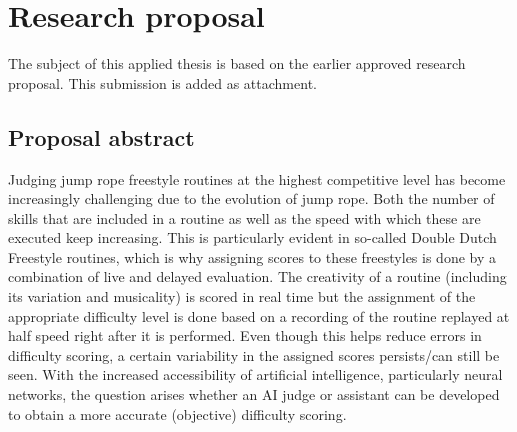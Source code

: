 \documentclass[english,dit,thesis]{hogentreport}
\begin{document}





%
%





\appendix

\chapter{Research proposal}

The subject of this applied thesis is based on the earlier approved research proposal. This submission is added as attachment.

\section*{Proposal abstract}

    Judging jump rope freestyle routines at the highest competitive level has become increasingly challenging due to the evolution of jump rope. Both the number of skills that are included in a routine as well as the speed with which these are executed keep increasing. This is particularly evident in so-called Double Dutch Freestyle routines, which is why assigning scores to these freestyles is done by a combination of live and delayed evaluation. The creativity of a routine (including its variation and musicality) is scored in real time but the assignment of the appropriate difficulty level is done based on a recording of the routine replayed at half speed right after it is performed. Even though this helps reduce errors in difficulty scoring, a certain variability in the assigned scores persists/can still be seen. With the increased accessibility of artificial intelligence, particularly neural networks, the question arises whether an AI judge or assistant can be developed to obtain a more accurate (objective) difficulty scoring.
\end{document}
